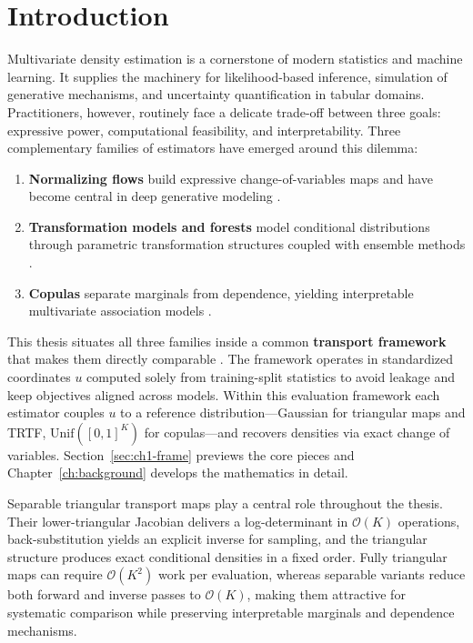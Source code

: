 \documentclass[11pt,a4paper,twoside]{book}\usepackage[]{graphicx}\usepackage[]{xcolor}
\begin{document}
\chapter{Introduction}\label{ch:intro}

Multivariate density estimation is a cornerstone of modern statistics and machine learning. It supplies the machinery for likelihood-based inference, simulation of generative mechanisms, and uncertainty quantification in tabular domains. Practitioners, however, routinely face a delicate trade-off between three goals: expressive power, computational feasibility, and interpretability. Three complementary families of estimators have emerged around this dilemma:
\begin{enumerate}
  \item \textbf{Normalizing flows} build expressive change-of-variables maps and have become central in deep generative modeling \citep{rezende2015variational,papamakarios2017masked,dinh2017real,durkan2019neural,kingma2018glow,papamakarios2021normalizing}.
  \item \textbf{Transformation models and forests} model conditional distributions through parametric transformation structures coupled with ensemble methods \citep{hothorn2017transformation,hothorn2018conditional,hothorn2021transformation}.
  \item \textbf{Copulas} separate marginals from dependence, yielding interpretable multivariate association models \citep{sklar1959fonctions,nelsen2006introduction,joe2014dependence,nagler2017kdecopula}.
\end{enumerate}

This thesis situates all three families inside a common \textbf{transport framework} that makes them directly comparable \citep{rosenblatt1952remarks,knothe1957contributions,bogachev2005triangular,ramgraber2025friendly}. The framework operates in standardized coordinates $u$ computed solely from training-split statistics to avoid leakage and keep objectives aligned across models. Within this evaluation framework each estimator couples $u$ to a reference distribution---Gaussian for triangular maps and TRTF, $\mathrm{Unif}([0,1]^K)$ for copulas---and recovers densities via exact change of variables. Section~\ref{sec:ch1-frame} previews the core pieces and Chapter~\ref{ch:background} develops the mathematics in detail.

Separable triangular transport maps play a central role throughout the thesis. Their lower-triangular Jacobian delivers a log-determinant in $\mathcal{O}(K)$ operations, back-substitution yields an explicit inverse for sampling, and the triangular structure produces exact conditional densities in a fixed order. Fully triangular maps can require $\mathcal{O}(K^2)$ work per evaluation, whereas separable variants reduce both forward and inverse passes to $\mathcal{O}(K)$, making them attractive for systematic comparison while preserving interpretable marginals and dependence mechanisms.
\end{document}
